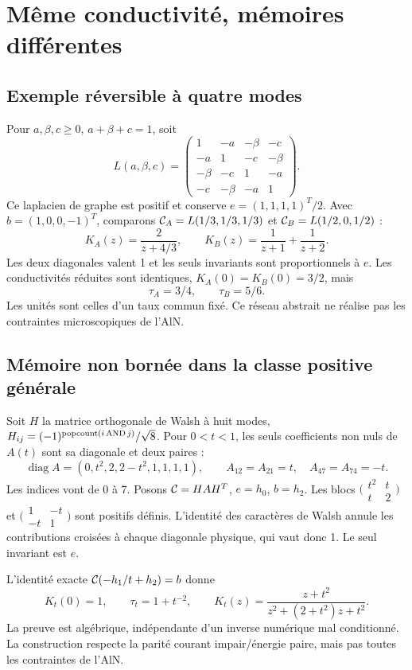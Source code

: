 \documentclass[11pt,a4paper]{article}
\begin{document}
\section{Même conductivité, mémoires différentes}
\subsection{Exemple réversible à quatre modes}
Pour $a,\beta,c\ge0$, $a+\beta+c=1$, soit
\[
 L(a,\beta,c)=
 \begin{pmatrix}
 1&-a&-\beta&-c\\-a&1&-c&-\beta\\
 -\beta&-c&1&-a\\-c&-\beta&-a&1
 \end{pmatrix}.
\]
Ce laplacien de graphe est positif et conserve $e=(1,1,1,1)^T/2$.
Avec $b=(1,0,0,-1)^T$, comparons
$ {\cal C}_A=L(1/3,1/3,1/3)$ et
$ {\cal C}_B=L(1/2,0,1/2)$ :
\[
 K_A(z)=\frac{2}{z+4/3},\qquad
 K_B(z)=\frac1{z+1}+\frac1{z+2}.
\]
Les deux diagonales valent 1 et les seuls invariants sont proportionnels à $e$.
Les conductivités réduites sont identiques, $K_A(0)=K_B(0)=3/2$, mais
\[
 \tau_A=3/4,\qquad \tau_B=5/6.
\]
Les unités sont celles d'un taux commun fixé. Ce réseau abstrait ne réalise pas les contraintes microscopiques de l'AlN.

\subsection{Mémoire non bornée dans la classe positive générale}
Soit $H$ la matrice orthogonale de Walsh à huit modes,
$H_{ij}=(-1)^{{\rm popcount}(i\,{\rm AND}\,j)}/\sqrt8$.
Pour $0<t<1$, les seuls coefficients non nuls de $A(t)$ sont sa diagonale et deux paires :
\[
 \operatorname{diag}A=(0,t^2,2,2-t^2,1,1,1,1),\qquad
 A_{12}=A_{21}=t,\quad A_{47}=A_{74}=-t .
\]
Les indices vont de 0 à 7. Posons $ {\cal C}=HAH^T$, $e=h_0$, $b=h_2$.
Les blocs
$\bigl(\begin{smallmatrix}t^2&t\\t&2\end{smallmatrix}\bigr)$ et
$\bigl(\begin{smallmatrix}1&-t\\-t&1\end{smallmatrix}\bigr)$
sont positifs définis. L'identité des caractères de Walsh annule les contributions croisées à chaque diagonale physique, qui vaut donc 1. Le seul invariant est $e$.

L'identité exacte $ {\cal C}(-h_1/t+h_2)=b$ donne
\[
 K_t(0)=1,\qquad \tau_t=1+t^{-2},\qquad
 K_t(z)=\frac{z+t^2}{z^2+(2+t^2)z+t^2}.
\]
La preuve est algébrique, indépendante d'un inverse numérique mal conditionné.
La construction respecte la parité courant impair/énergie paire, mais pas toutes les contraintes de l'AlN.
\end{document}
